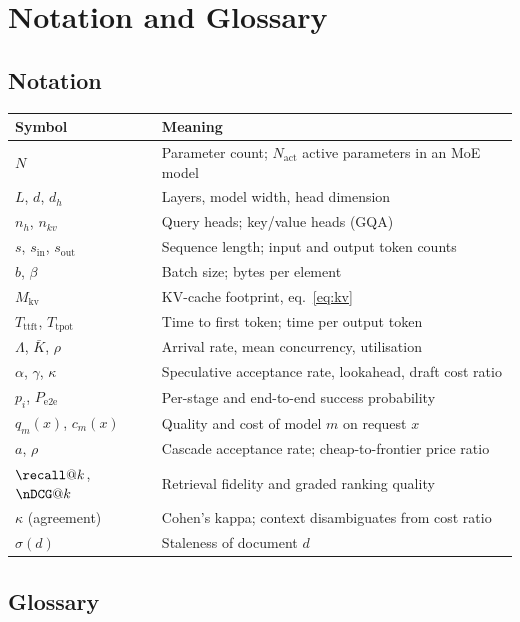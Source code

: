 \documentclass[11pt,twoside,openright]{book}
\theoremstyle{definition}
\theoremstyle{plain}
\theoremstyle{remark}
\newcommand{\ttft}{\ensuremath{T_{\mathrm{ttft}}}}
\newcommand{\tpot}{\ensuremath{T_{\mathrm{tpot}}}}
\begin{document}
\cleardoublepage

\chapter{Notation and Glossary}

\section{Notation}

\begin{longtable}{@{}p{2.4cm} p{11.4cm}@{}}
\toprule
\textbf{Symbol} & \textbf{Meaning} \\
\midrule
\endhead
$N$ & Parameter count; $N_{\text{act}}$ active parameters in an MoE model \\
$L$, $d$, $d_h$ & Layers, model width, head dimension \\
$n_h$, $n_{kv}$ & Query heads; key/value heads (GQA) \\
$s$, $s_{\text{in}}$, $s_{\text{out}}$ & Sequence length; input and output token counts \\
$b$, $\beta$ & Batch size; bytes per element \\
$M_{\text{kv}}$ & KV-cache footprint, eq.~\eqref{eq:kv} \\
\ttft, \tpot & Time to first token; time per output token \\
$\Lambda$, $\bar{K}$, $\rho$ & Arrival rate, mean concurrency, utilisation \\
$\alpha$, $\gamma$, $\kappa$ & Speculative acceptance rate, lookahead, draft cost ratio \\
$p_i$, $P_{\text{e2e}}$ & Per-stage and end-to-end success probability \\
$q_m(x)$, $c_m(x)$ & Quality and cost of model $m$ on request $x$ \\
$a$, $\rho$ & Cascade acceptance rate; cheap-to-frontier price ratio \\
$\recall@k$, $\nDCG@k$ & Retrieval fidelity and graded ranking quality \\
$\kappa$ (agreement) & Cohen's kappa; context disambiguates from cost ratio \\
$\sigma(d)$ & Staleness of document $d$ \\
\bottomrule
\end{longtable}

\section{Glossary}
\end{document}
